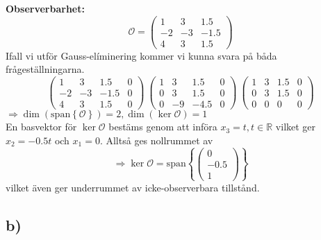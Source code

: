 \documentclass[12pt]{article}
\newcommand{\sspan}[1]{\mathrm{span}\left\{#1\right\}}
\begin{document}
\textbf{Observerbarhet:}
\begin{equation*}
  \mathcal{O} =
  \begin{pmatrix}
    1 & 3 & 1.5 \\
    -2 & -3 & -1.5 \\
    4 & 3 & 1.5
  \end{pmatrix}
\end{equation*}
Ifall vi utför Gauss-elíminering kommer vi kunna svara på båda frågeställningarna.
\begin{equation*}
  \left(
  \begin{array}{ccc|c}
    1 & 3 & 1.5 & 0\\
    -2 & -3 & -1.5 & 0 \\
    4 & 3 & 1.5 & 0
  \end{array}\right) ~ 
\left(
  \begin{array}{ccc|c}
    1 & 3 & 1.5 & 0 \\
    0 & 3 & 1.5 & 0 \\
    0 & -9 & -4.5 & 0
  \end{array}
\right) ~ \left(
  \begin{array}{ccc|c}
    1 & 3 & 1.5 & 0 \\
    0 & 3 & 1.5 & 0 \\
    0 & 0 & 0 & 0
  \end{array}
\right)
\end{equation*}
$\Rightarrow \dim{(\sspan{\mathcal{O}})} = 2, \dim{(\ker{\mathcal{O}})} = 1$ \\
En basvektor för $\ker{\mathcal{O}}$ bestäms genom att införa $x_3 = t, t \in \mathbb{R}$ vilket ger $x_2 = -0.5t$ och $x_1 = 0$. Alltså ges nollrummet av
\[\Rightarrow \ker{\mathcal{O}} = \sspan{
  \begin{pmatrix}
    0 \\
    -0.5 \\
    1
  \end{pmatrix}
}\]
vilket även ger underrummet av icke-observerbara tillstånd.

\subsection*{b)}
\end{document}
